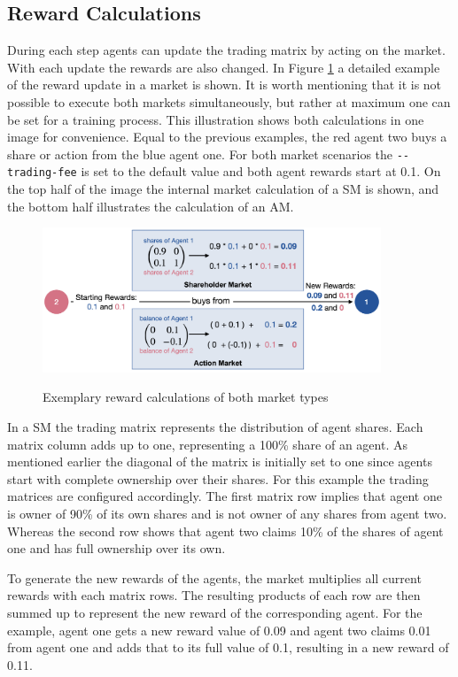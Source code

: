 \subsection{Reward Calculations}\label{market_reward_calc}
During each step agents can update the trading matrix by acting on the market. With each update the rewards are also changed. In Figure \ref{fig:market_rewards} a detailed example of the reward update in a market is shown. It is worth mentioning that it is not possible to execute both markets simultaneously, but rather at maximum one can be set for a training process. This illustration shows both calculations in one image for convenience. Equal to the previous examples, the red agent two buys a share or action from the blue agent one. For both market scenarios the \verb|--trading-fee| is set to the default value and both agent rewards start at 0.1. On the top half of the image the internal market calculation of a SM is shown, and the bottom half illustrates the calculation of an AM.
\begin{figure}[hpbt]
    \centering
    \includegraphics[width=0.9\textwidth]{pictures/new_market_rewards}\\
    \caption[Exemplary Reward Calculation Of Markets]{Exemplary reward calculations of both market types}\label{fig:market_rewards}
\end{figure}

In a SM the trading matrix represents the distribution of agent shares. Each matrix column adds up to one, representing a 100\% share of an agent. As mentioned earlier the diagonal of the matrix is initially set to one since agents start with complete ownership over their shares. For this example the trading matrices are configured accordingly. The first matrix row implies that agent one is owner of 90\% of its own shares and is not owner of any shares from agent two. Whereas the second row shows that agent two claims 10\% of the shares of agent one and has full ownership over its own.

To generate the new rewards of the agents, the market multiplies all current rewards with each matrix rows. The resulting products of each row are then summed up to represent the new reward of the corresponding agent. For the example, agent one gets a new reward value of 0.09 and agent two claims 0.01 from agent one and adds that to its full value of 0.1, resulting in a new reward of 0.11. 

